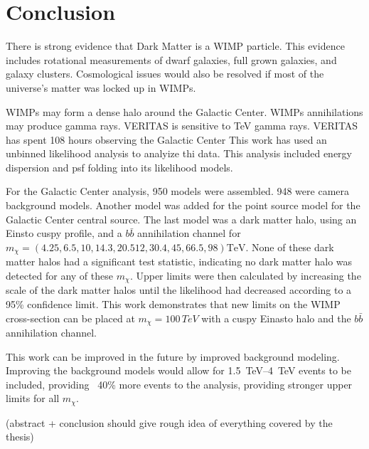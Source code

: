\cleartooddpage[\thispagestyle{empty}]
\chapter{Conclusion}

There is strong evidence that Dark Matter is a WIMP particle.
This evidence includes rotational measurements of dwarf galaxies, full grown galaxies, and galaxy clusters.
Cosmological issues would also be resolved if most of the universe's matter was locked up in WIMPs.

WIMPs may form a dense halo around the Galactic Center.
WIMPs annihilations may produce gamma rays.
VERITAS is sensitive to TeV gamma rays.
VERITAS has spent 108 hours observing the Galactic Center
This work has used an unbinned likelihood analysis to analyize thi data.
This analysis included energy dispersion and psf folding into its likelihood models.

For the Galactic Center analysis, 950 models were assembled.
948 were camera background models.
Another model was added for the point source model for the Galactic Center central source.
The last model was a dark matter halo, using an Einsto cuspy profile, and a $b\bar{b}$ annihilation channel for $m_{\chi}=(4.25,6.5, 10, 14.3, 20.512, 30.4, 45, 66.5, 98) \textrm{TeV}$.
None of these dark matter halos had a significant test statistic, indicating no dark matter halo was detected for any of these $m_{\chi}$.
Upper limits were then calculated by increasing the scale of the dark matter halos until the likelihood had decreased according to a 95\% confidence limit.
This work demonstrates that new limits on the WIMP cross-section can be placed at $m_{\chi}=100\,TeV$ with a cuspy Einasto halo and the $b\bar{b}$ annihilation channel.

This work can be improved in the future by improved background modeling.
Improving the background models would allow for \SIrange{1.5}{4}{TeV} events to be included, providing ~40\% more events to the analysis, providing stronger upper limits for all $m_{\chi}$.

{\color{red}(abstract + conclusion should give rough idea of everything covered by the thesis)}

